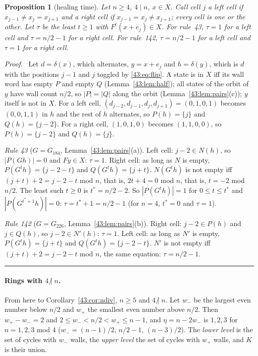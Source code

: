\documentclass[10pt,a4paper]{article}
\newtheorem{proposition}[theorem]{Proposition}
\newcommand{\qedmark}{\rule{1.1ex}{1.1ex}}
\newenvironment{proof}[1][Proof]{\par\smallskip\noindent\textit{#1.}\ }{\hfill\qedmark\par\smallskip}
\newcommand{\ndiv}{\mathrel{\not|}}           %
\begin{document}
\begin{proposition}[healing time]\label{43:prop:heal}
Let $n\ge 4$, $4\mid n$, $x\in X$. Call cell $j$ a \emph{left cell} if $x_{j-1}\ne x_j=x_{j+1}$ and a
\emph{right cell} if $x_{j-1}=x_j\ne x_{j+1}$; every cell is one or the other. Let $\tau$ be the least $t\ge 1$
with $F^t(x+e_j)\in X$. For rule~43, $\tau=1$ for a left cell and $\tau=n/2-1$ for a right cell. For rule~142,
$\tau=n/2-1$ for a left cell and $\tau=1$ for a right cell.
\end{proposition}
\begin{proof}
Let $d=\delta(x)$, which alternates, $y=x+e_j$ and $h=\delta(y)$, which is $d$ with the positions $j-1$ and $j$
toggled by \eqref{43:eq:flip}. A state is in $X$ iff its wall word has empty $P$ and empty $Q$
(Lemma~\ref{43:lem:half}); all states of the orbit of $y$ have wall count $n/2$, so $|P|=|Q|$ along the orbit
(Lemma~\ref{43:lem:pairs}(c)); $y$ itself is not in $X$.
For a left cell, $(d_{j-2},d_{j-1},d_j,d_{j+1})=(0,1,0,1)$ becomes $(0,0,1,1)$ in $h$ and the rest of $h$
alternates, so $P(h)=\{j\}$ and $Q(h)=\{j-2\}$. For a right cell, $(1,0,1,0)$ becomes $(1,1,0,0)$, so
$P(h)=\{j-2\}$ and $Q(h)=\{j\}$.

\emph{Rule 43} ($G=G_{184}$, Lemma~\ref{43:lem:pairs}(a)). Left cell: $j-2\in N(h)$, so $|P(Gh)|=0$ and
$Fy\in X$: $\tau=1$. Right cell: as long as $N$ is empty, $P(G^th)=\{j-2-t\}$ and $Q(G^th)=\{j+t\}$. $N(G^th)$ is
not empty iff $(j+t)+2=j-2-t$ mod $n$, that is, $2t+4=0$ mod $n$, that is, $t=-2$ mod $n/2$. The least such
$t\ge 0$ is $t^*=n/2-2$. So $|P(G^th)|=1$ for $0\le t\le t^*$ and $|P(G^{t^*+1}h)|=0$: $\tau=t^*+1=n/2-1$ (for
$n=4$, $t^*=0$ and $\tau=1$).

\emph{Rule 142} ($G=G_{226}$, Lemma~\ref{43:lem:pairs}(b)). Right cell: $j-2\in P(h)$ and $j\in Q(h)$, so
$j-2\in N'(h)$: $\tau=1$. Left cell: as long as $N'$ is empty, $P(G^th)=\{j+t\}$ and $Q(G^th)=\{j-2-t\}$. $N'$ is
not empty iff $(j+t)+2=j-2-t$ mod $n$, the same equation: $\tau=n/2-1$.
\end{proof}

\paragraph{Rings with $4\ndiv n$.}
From here to Corollary~\ref{43:cor:ndiv}, $n\ge 5$ and $4\ndiv n$. Let $w_-$ be the largest even number below $n/2$ and $w_+$ the
smallest even number above $n/2$. Then $w_+-w_-=2$ and $2\le w_-<n/2<w_+\le n-1$, and $\eta=n-2w_-$ is $1,2,3$
for $n=1,2,3$ mod $4$ ($w_-=(n-1)/2$, $n/2-1$, $(n-3)/2$). The \emph{lower level} is the set of cycles with $w_-$
walls, the \emph{upper level} the set of cycles with $w_+$ walls, and $K$ is their union.
\end{document}

